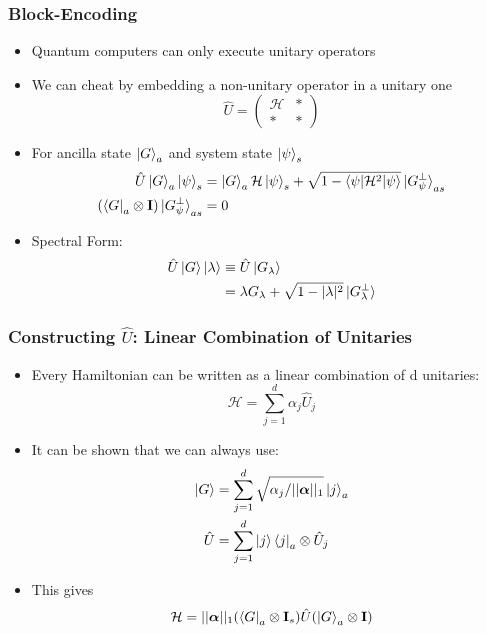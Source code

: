 \documentclass[aspectratio=169]{beamer}
\begin{document}
\begin{frame}
	\frametitle{Block-Encoding}
	\begin{itemize}[<+->]
	\item Quantum computers can only execute unitary operators
	\item We can cheat by embedding a non-unitary operator in a unitary one
	\begin{equation}
	\hat{U} = \begin{pmatrix}\mathcal{H} & * \\ * & *\end{pmatrix}
	\end{equation}
	\item For ancilla state $\ket{G}_a$ and system state $\ket{\psi}_s$
	\begin{align}
		\nonumber \hat{U}\ket{G}_a\ket{\psi}_s &= \ket{G}_a\mathcal{H}\ket{\psi}_s+\sqrt{1-\braket{\psi|\mathcal{H}^2|\psi}}\ket{G_\psi^{\perp}}_{as}\\
		\nonumber (\bra{G}_a\otimes \mathbf{I})\ket{G_\psi^{\perp}}_{as}&= 0
	\end{align}
	\item Spectral Form:
		\begin{align}
		\nonumber\hat{U}\ket{G}\ket{\lambda}&\equiv\hat{U}\ket{G_\lambda}\\
		\nonumber&=\lambda{G_\lambda}+\sqrt{1-|\lambda|^2}\ket{G_\lambda^{\perp}}
		\end{align}
	\end{itemize}
\end{frame}

\begin{frame}
	\frametitle{Constructing $\hat{U}$: Linear Combination of Unitaries}
	\begin{itemize}[<+->]
		\item Every Hamiltonian can be written as a linear combination of d unitaries:
		\begin{equation}\nonumber
		\mathcal{H} = \sum_{j=1}^d \alpha_j \hat{U}_j
		\end{equation}
		\item It can be shown that we can always use:
		\begin{align}
			\nonumber \ket{G} &= \sum_{j=1}^d\sqrt{\alpha_j/||\boldsymbol{\alpha}||_1}\ket{j}_a\\
			\nonumber \hat{U} &= \sum_{j=1}^d\ket{j}\bra{j}_a\otimes\hat{U}_j
		\end{align}
		\item This gives 
		\begin{equation}
			\mathcal{H} = ||\boldsymbol{\alpha}||_1(\bra{G}_a\otimes \mathbf{I}_s)\hat{U}(\ket{G}_a\otimes\mathbf{I})
		\end{equation}
	\end{itemize}
\end{frame}
\end{document}
